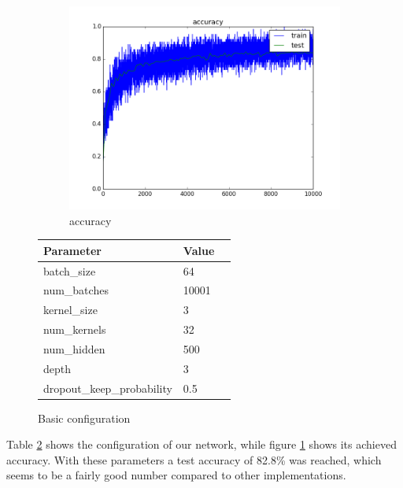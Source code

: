 \documentclass{article}
\begin{document}
\begin{enumerate}
\begin{enumerate}
		
		\begin{item}
		\begin{figure}
		\centering
			\begin{subfigure}[b]{0.45\textwidth}
				\includegraphics[width=\textwidth]{figures/accuracy_32kernels}
				\caption{accuracy}
				\label{fig:basic_accu}
			\end{subfigure}	
			\quad
			\begin{subtable}[b]{0.4\textwidth}
				\begin{tabular}{lll}
        					\toprule
        					Parameter     & Value \\
        					\midrule
        					batch\_size & 64  \\
        					num\_batches & 10001  \\
        					kernel\_size &3 \\
        					num\_kernels & 32 \\
        					num\_hidden & 500 \\
        					depth & 3 \\
        					dropout\_keep\_probability & 0.5 \\
        					\bottomrule
     				\end{tabular}
				\caption{Basic configuration}
				\label{basic_config}
			\end{subtable}
		\end{figure}
		
		Table \ref{basic_config} shows the configuration of our network, while figure \ref{fig:basic_accu} shows its achieved accuracy.		
			With these parameters a test accuracy of 82.8\% was reached, which seems to be a fairly good number compared to other implementations.
			

\end{item}
\end{enumerate}
\end{enumerate}
\end{document}
